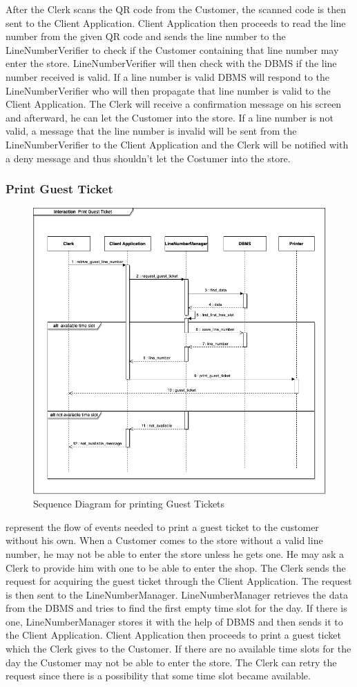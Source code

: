After the Clerk scans the QR code from the Customer, the scanned code is then sent to the Client Application.
Client Application then proceeds to read the line number from the given QR code and sends the line number to the LineNumberVerifier to check if the Customer containing that line number may enter the store.
LineNumberVerifier will then check with the DBMS if the line number received is valid. If a line number is valid DBMS will respond to the LineNumberVerifier who will then propagate that line number is valid to the Client Application.
The Clerk will receive a confirmation message on his screen and afterward, he can let the Customer into the store.
If a line number is not valid, a message that the line number is invalid will be sent from the LineNumberVerifier to the Client Application and the Clerk will be notified with a deny message and thus shouldn't let the Costumer into the store.

\subsubsection{Print Guest Ticket}
\begin{figure}[H]
    \centering
    \includegraphics[height=0.6\textwidth]{Images/SequenceDiagrams/PrintGuestTicket.png}
    \caption{Sequence Diagram for printing Guest Tickets}
    \label{fig:SDPrintGuestTicket}
\end{figure}
 represent the flow of events needed to print a guest ticket to the customer without his own.
When a Customer comes to the store without a valid line number, he may not be able to enter the store unless he gets one.
He may ask a Clerk to provide him with one to be able to enter the shop. The Clerk sends the request for acquiring the guest ticket through the Client Application.
The request is then sent to the LineNumberManager. LineNumberManager retrieves the data from the DBMS and tries to find the first empty time slot for the day.
If there is one, LineNumberManager stores it with the help of DBMS and then sends it to the Client Application. Client Application then proceeds to print a guest ticket which the Clerk gives to the Customer.
If there are no available time slots for the day the Customer may not be able to enter the store. The Clerk can retry the request since there is a possibility that some time slot became available.


